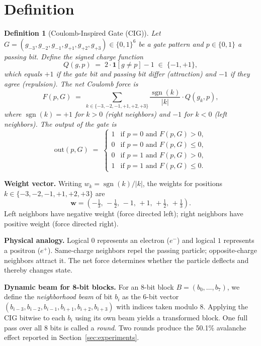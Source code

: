 \documentclass[10pt,a4paper]{article}
\newtheorem{definition}{Definition}
\begin{document}
\section{Definition}

\begin{definition}[Coulomb-Inspired Gate (CIG)]
Let $G = (g_{-3}, g_{-2}, g_{-1}, g_{+1}, g_{+2}, g_{+3}) \in \{0,1\}^6$
be a \emph{gate pattern} and $p \in \{0,1\}$ a \emph{passing bit}.
Define the signed charge function
\[
  Q(g, p) \;=\; 2\cdot\mathbf{1}[g \neq p] - 1 \;\in\; \{-1, +1\},
\]
which equals $+1$ if the gate bit and passing bit differ (attraction) and
$-1$ if they agree (repulsion). The \emph{net Coulomb force} is
\[
  F(p, G) \;=\; \sum_{k \in \{-3,-2,-1,+1,+2,+3\}} \frac{\operatorname{sgn}(k)}{|k|} \cdot Q(g_k, p),
\]
where $\operatorname{sgn}(k) = +1$ for $k>0$ (right neighbors) and $-1$ for
$k < 0$ (left neighbors). The output of the gate is
\[
  \mathrm{out}(p, G) \;=\;
  \begin{cases}
    1 & \text{if } p = 0 \text{ and } F(p,G) > 0,\\
    0 & \text{if } p = 0 \text{ and } F(p,G) \le 0,\\
    0 & \text{if } p = 1 \text{ and } F(p,G) > 0,\\
    1 & \text{if } p = 1 \text{ and } F(p,G) \le 0.
  \end{cases}
\]
\end{definition}

\noindent\textbf{Weight vector.}
Writing $w_k = \operatorname{sgn}(k)/|k|$, the weights for positions
$k \in \{-3,-2,-1,+1,+2,+3\}$ are
\[
  \mathbf{w} = \left(-\tfrac{1}{3},\,-\tfrac{1}{2},\,-1,\,+1,\,+\tfrac{1}{2},\,+\tfrac{1}{3}\right).
\]
Left neighbors have negative weight (force directed left);
right neighbors have positive weight (force directed right).

\noindent\textbf{Physical analogy.}
Logical $0$ represents an electron ($e^-$) and logical $1$ represents a positron ($e^+$).
Same-charge neighbors repel the passing particle; opposite-charge neighbors attract it.
The net force determines whether the particle deflects and thereby changes state.

\noindent\textbf{Dynamic beam for 8-bit blocks.}
For an 8-bit block $B = (b_0,\dots,b_7)$, we define the \emph{neighborhood beam} of bit $b_i$ as the 6-bit vector
$(b_{i-3}, b_{i-2}, b_{i-1}, b_{i+1}, b_{i+2}, b_{i+3})$ with indices taken modulo 8.
Applying the CIG bitwise to each $b_i$ using its own beam yields a transformed block.
One full pass over all 8 bits is called a \emph{round}. Two rounds produce the 50.1\% avalanche effect reported in Section~\ref{sec:experiments}.
\end{document}
